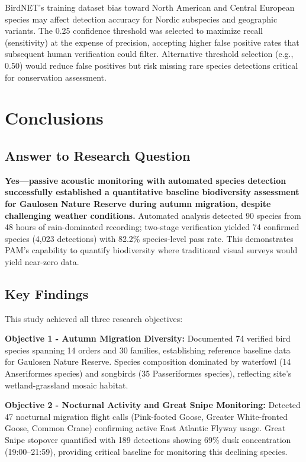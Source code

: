 \documentclass[english,twocolumn]{article}
\begin{document}
BirdNET's training dataset bias toward North American and Central European species may affect detection accuracy for Nordic subspecies and geographic variants. The 0.25 confidence threshold was selected to maximize recall (sensitivity) at the expense of precision, accepting higher false positive rates that subsequent human verification could filter. Alternative threshold selection (e.g., 0.50) would reduce false positives but risk missing rare species detections critical for conservation assessment.

\section{Conclusions}

\subsection{Answer to Research Question}

\textbf{Yes—passive acoustic monitoring with automated species detection successfully established a quantitative baseline biodiversity assessment for Gaulosen Nature Reserve during autumn migration, despite challenging weather conditions.} Automated analysis detected 90 species from 48 hours of rain-dominated recording; two-stage verification yielded 74 confirmed species (4,023 detections) with 82.2\% species-level pass rate. This demonstrates PAM's capability to quantify biodiversity where traditional visual surveys would yield near-zero data.

\subsection{Key Findings}

This study achieved all three research objectives:

\textbf{Objective 1 - Autumn Migration Diversity:} Documented 74 verified bird species spanning 14 orders and 30 families, establishing reference baseline data for Gaulosen Nature Reserve. Species composition dominated by waterfowl (14 Anseriformes species) and songbirds (35 Passeriformes species), reflecting site's wetland-grassland mosaic habitat.

\textbf{Objective 2 - Nocturnal Activity and Great Snipe Monitoring:} Detected 47 nocturnal migration flight calls (Pink-footed Goose, Greater White-fronted Goose, Common Crane) confirming active East Atlantic Flyway usage. Great Snipe stopover quantified with 189 detections showing 69\% dusk concentration (19:00--21:59), providing critical baseline for monitoring this declining species.
\end{document}
